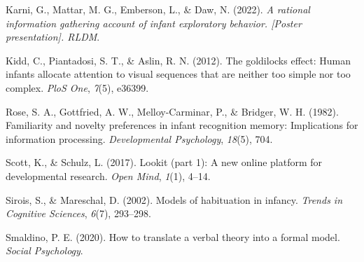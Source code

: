 \documentclass[10pt, letterpaper]{article}
\newenvironment{CSLReferences}%
  {}%
  {\par}
\begin{document}
\begin{CSLReferences}{1}{0}
\leavevmode{}%
Karni, G., Mattar, M. G., Emberson, L., \& Daw, N. (2022). \emph{A
rational information gathering account of infant exploratory behavior.
{[}Poster presentation{]}. RLDM}.

\leavevmode{}%
Kidd, C., Piantadosi, S. T., \& Aslin, R. N. (2012). The goldilocks
effect: Human infants allocate attention to visual sequences that are
neither too simple nor too complex. \emph{PloS One}, \emph{7}(5),
e36399.

\leavevmode{}%
Rose, S. A., Gottfried, A. W., Melloy-Carminar, P., \& Bridger, W. H.
(1982). Familiarity and novelty preferences in infant recognition
memory: Implications for information processing. \emph{Developmental
Psychology}, \emph{18}(5), 704.

\leavevmode{}%
Scott, K., \& Schulz, L. (2017). Lookit (part 1): A new online platform
for developmental research. \emph{Open Mind}, \emph{1}(1), 4--14.

\leavevmode{}%
Sirois, S., \& Mareschal, D. (2002). Models of habituation in infancy.
\emph{Trends in Cognitive Sciences}, \emph{6}(7), 293--298.

\leavevmode{}%
Smaldino, P. E. (2020). How to translate a verbal theory into a formal
model. \emph{Social Psychology}.

\end{CSLReferences}


\end{document}
